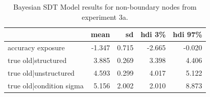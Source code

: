 \begin{table}[H]
    \centering
    \caption{Bayesian SDT Model results for non-boundary nodes from experiment 3a. }
    \label{tab:exp3-bayesmodel-nonboundary-sdt}
    \begin{tabular}{lrrrr}
        \toprule
         & mean & sd & hdi 3\% & hdi 97\% \\
        \midrule
        accuracy exposure & -1.347 & 0.715 & -2.665 & -0.020 \\
        true old|structured & 3.885 & 0.269 & 3.398 & 4.406 \\
        true old|unstructured & 4.593 & 0.299 & 4.017 & 5.122 \\
        true old|condition sigma & 5.156 & 2.002 & 2.010 & 8.873 \\
        \bottomrule
        \end{tabular}
        
\end{table}

